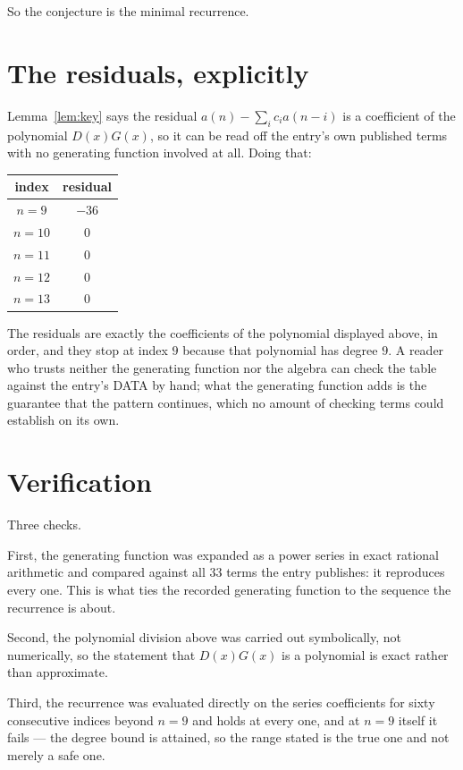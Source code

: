 \documentclass[11pt,a4paper]{article}
\theoremstyle{plain}
\theoremstyle{definition}
\begin{document}
So the conjecture is the minimal recurrence.

\section{The residuals, explicitly}

Lemma~\ref{lem:key} says the residual $a(n)-\sum_ic_ia(n-i)$ is a coefficient of the
polynomial $D(x)G(x)$, so it can be read off the entry's own published terms with no
generating function involved at all. Doing that:
\begin{center}
\begin{tabular}{cc}
index & residual \\ \hline
$n=9$ & $-36$ \\
$n=10$ & $0$ \\
$n=11$ & $0$ \\
$n=12$ & $0$ \\
$n=13$ & $0$
\end{tabular}
\end{center}
The residuals are exactly the coefficients of the polynomial displayed above, in order, and
they stop at index $9$ because that polynomial has degree $9$. A reader who trusts
neither the generating function nor the algebra can check the table against the entry's DATA
by hand; what the generating function adds is the guarantee that the pattern continues, which
no amount of checking terms could establish on its own.

\section{Verification}

Three checks.

First, the generating function was expanded as a power series in exact rational arithmetic and
compared against all $33$ terms the entry publishes: it reproduces every one. This is
what ties the recorded generating function to the sequence the recurrence is about.

Second, the polynomial division above was carried out symbolically, not numerically, so the
statement that $D(x)G(x)$ is a polynomial is exact rather than approximate.

Third, the recurrence was evaluated directly on the series coefficients for sixty consecutive
indices beyond $n=9$ and holds at every one, and at $n=9$ itself it fails --- the
degree bound is attained, so the range stated is the true one and not merely a safe one.
\end{document}
